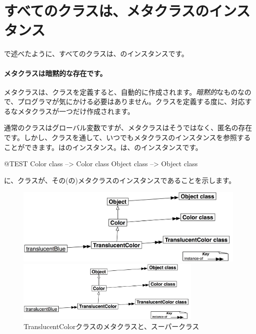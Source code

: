 \documentclass[a4paper,10pt,twoside]{book}
\begin{document}
\section{すべてのクラスは、メタクラスのインスタンス}


で述べたように、すべてのクラスは、のインスタンスです。

\paragraph{メタクラスは暗黙的な存在です。}
メタクラスは、クラスを定義すると、自動的に作成されます。\emph{暗黙的}なものなので、プログラマが気にかける必要はありません。クラスを定義する度に、対応するなメタクラスが一つだけ作成されます。

通常のクラスはグローバル変数ですが、メタクラスはそうではなく、匿名の存在です。しかし、クラスを通して、いつでもメタクラスのインスタンスを参照することができます。はのインスタンス。は、のインスタンスです。
\begin{code}{@TEST}
Color class   --> Color class
Object class --> Object class
\end{code}

\noindent
{}に、クラスが、その(の)メタクラスのインスタンスであることを示します。

\begin{center}
\begin{figure}[!ht]
\ifluluelse
	{\centerline {\includegraphics[width=\textwidth]{TranslucentMetaclasses}}}
	{\centerline {\includegraphics[width=0.8\textwidth]{TranslucentMetaclasses}}}
\caption{TranslucentColorクラスのメタクラスと、スーパークラス}
\end{figure}
\end{center}
\end{document}
